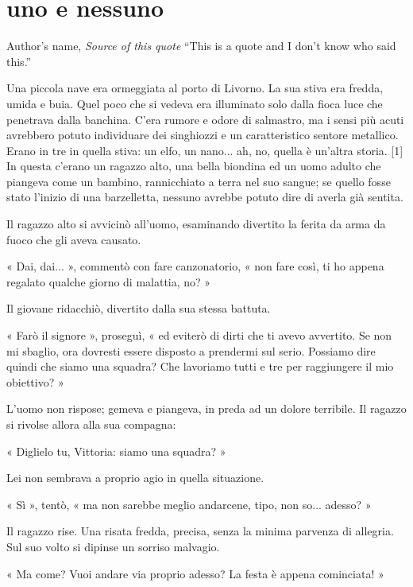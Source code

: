 \chapter{uno e nessuno}

\begin{chapquote}{Author's name, \textit{Source of this quote}}
``This is a quote and I don't know who said this.''
\end{chapquote}


Una piccola nave era ormeggiata al porto di Livorno. La sua stiva era fredda, umida e buia. Quel poco che si vedeva era illuminato solo dalla fioca luce che penetrava dalla banchina. C'era rumore e odore di salmastro, ma i sensi più acuti avrebbero potuto individuare dei singhiozzi e un caratteristico sentore metallico. Erano in tre in quella stiva: un elfo, un nano... ah, no, quella è un'altra storia. [1] In questa c'erano un ragazzo alto, una bella biondina ed un uomo adulto che piangeva come un bambino, rannicchiato a terra nel suo sangue; se quello fosse stato l'inizio di una barzelletta, nessuno avrebbe potuto dire di averla già sentita.

Il ragazzo alto si avvicinò all'uomo, esaminando divertito la ferita da arma da fuoco che gli aveva causato.

« Dai, dai... », commentò con fare canzonatorio, « non fare così, ti ho appena regalato qualche giorno di malattia, no? »

Il giovane ridacchiò, divertito dalla sua stessa battuta.

« Farò il signore », proseguì, « ed eviterò di dirti che ti avevo avvertito. Se non mi sbaglio, ora dovresti essere disposto a prendermi sul serio. Possiamo dire quindi che siamo una squadra? Che lavoriamo tutti e tre per raggiungere il mio obiettivo? »

L'uomo non rispose; gemeva e piangeva, in preda ad un dolore terribile. Il ragazzo si rivolse allora alla sua compagna:

« Diglielo tu, Vittoria: siamo una squadra? »

Lei non sembrava a proprio agio in quella situazione.

« Sì », tentò, « ma non sarebbe meglio andarcene, tipo, non so... adesso? »

Il ragazzo rise. Una risata fredda, precisa, senza la minima parvenza di allegria. Sul suo volto si dipinse un sorriso malvagio.

« Ma come? Vuoi andare via proprio adesso? La festa è appena cominciata! »


